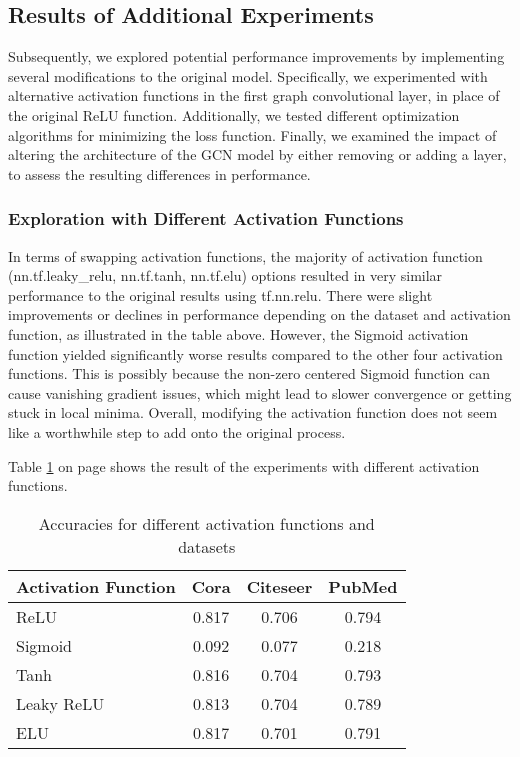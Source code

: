 \documentclass[11pt,a4paper]{article}
\begin{document}
\subsection{Results of Additional Experiments}

Subsequently, we explored potential performance improvements by implementing several modifications to the original model. Specifically, we experimented with alternative activation functions in the first graph convolutional layer, in place of the original ReLU function. Additionally, we tested different optimization algorithms for minimizing the loss function. Finally, we examined the impact of altering the architecture of the GCN model by either removing or adding a layer, to assess the resulting differences in performance.

\subsubsection{Exploration with Different Activation Functions}

In terms of swapping activation functions, the majority of activation function (nn.tf.leaky\_relu, nn.tf.tanh, nn.tf.elu) options resulted in very similar performance to the original results using tf.nn.relu. There were slight improvements or declines in performance depending on the dataset and activation function, as illustrated in the table above. However, the Sigmoid activation function yielded significantly worse results compared to the other four activation functions. This is possibly because the non-zero centered Sigmoid function can cause vanishing gradient issues, which might lead to slower convergence or getting stuck in local minima. Overall, modifying the activation function does not seem like a worthwhile step to add onto the original process.

Table \ref{table:activation-functions} on page \pageref{table:activation-functions} shows the result of the experiments with different activation functions.

\begin{table}[h]
  \centering
  \begin{tabular}{p{2cm}|c|c|c}
  \textbf{Activation Function} & \textbf{Cora} & \textbf{Citeseer} & \textbf{PubMed} \\ \hline
  ReLU        & 0.817 & 0.706 & 0.794 \\
  Sigmoid     & 0.092 & 0.077 & 0.218 \\
  Tanh        & 0.816 & 0.704 & 0.793 \\
  Leaky ReLU  & 0.813 & 0.704 & 0.789 \\
  ELU         & 0.817 & 0.701 & 0.791
  \end{tabular}
  \caption{Accuracies for different activation functions and datasets}
  \label{table:activation-functions}
\end{table}
\end{document}
